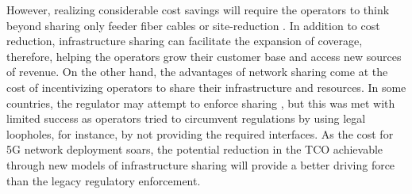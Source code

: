 However, realizing considerable cost savings will require the operators to think beyond sharing only feeder fiber cables or site-reduction \cite{5185100}. In addition to cost reduction, infrastructure sharing can facilitate the expansion of coverage, therefore, helping the operators grow their customer base and access new sources of revenue.
On the other hand, the advantages of network sharing come at the cost of incentivizing operators to share their infrastructure and resources. In some countries, the regulator may attempt to enforce sharing \cite{nepal_sharing}, but this was met with limited success as operators tried to circumvent regulations by using legal loopholes, for instance, by not providing the required interfaces. As the cost for \ac{5G} network deployment soars, the potential reduction in the \ac{TCO} achievable through new models of infrastructure sharing will provide a better driving force than the legacy regulatory enforcement.



